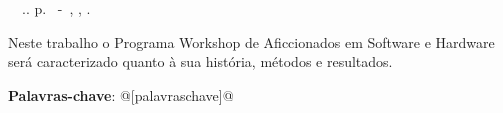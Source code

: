 \setlength{\absparsep}{18pt} %
\begin{resumo}
\begin{flushleft} 
\setlength{\absparsep}{0pt} %
\SingleSpacing 
\imprimirautorabr~~\textbf{\imprimirtituloresumo}.\imprimirdata. \pageref{LastPage}p. 
\imprimirtipotrabalho~-~\imprimirinstituicao, \imprimirlocal, \imprimirdata. 
 \end{flushleft}
\OnehalfSpacing 
Neste trabalho o Programa Workshop de Aficcionados em Software e Hardware ser\'a caracterizado quanto \`a sua hist\'oria, m\'etodos e resultados.
 

 \textbf{Palavras-chave}: @[palavraschave]@
\end{resumo}